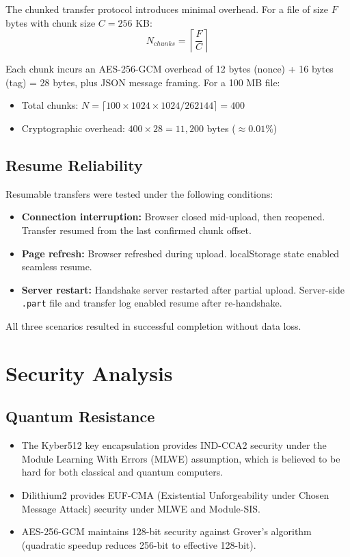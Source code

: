 The chunked transfer protocol introduces minimal overhead. For a file of size $F$ bytes with chunk size $C = 256$ KB:
\[
N_{chunks} = \left\lceil \frac{F}{C} \right\rceil
\]

Each chunk incurs an AES-256-GCM overhead of 12 bytes (nonce) + 16 bytes (tag) = 28 bytes, plus JSON message framing. For a 100 MB file:
\begin{itemize}
    \item Total chunks: $N = \lceil 100 \times 1024 \times 1024 / 262144 \rceil = 400$
    \item Cryptographic overhead: $400 \times 28 = 11,200$ bytes ($\approx 0.01\%$)
\end{itemize}

\subsection{Resume Reliability}

Resumable transfers were tested under the following conditions:
\begin{itemize}
    \item \textbf{Connection interruption:} Browser closed mid-upload, then reopened. Transfer resumed from the last confirmed chunk offset.
    \item \textbf{Page refresh:} Browser refreshed during upload. localStorage state enabled seamless resume.
    \item \textbf{Server restart:} Handshake server restarted after partial upload. Server-side \texttt{.part} file and transfer log enabled resume after re-handshake.
\end{itemize}

All three scenarios resulted in successful completion without data loss.

\section{Security Analysis}

\subsection{Quantum Resistance}
\begin{itemize}
    \item The Kyber512 key encapsulation provides IND-CCA2 security under the Module Learning With Errors (MLWE) assumption, which is believed to be hard for both classical and quantum computers.
    \item Dilithium2 provides EUF-CMA (Existential Unforgeability under Chosen Message Attack) security under MLWE and Module-SIS.
    \item AES-256-GCM maintains 128-bit security against Grover's algorithm (quadratic speedup reduces 256-bit to effective 128-bit).
\end{itemize}

